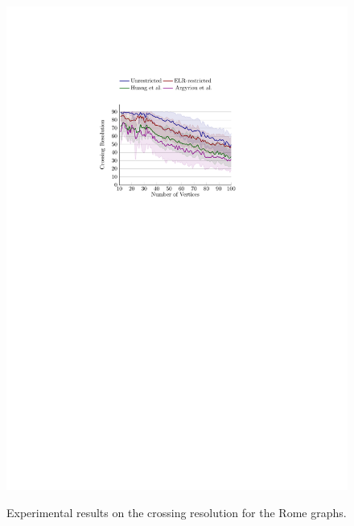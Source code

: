 \documentclass{comjnl}
\begin{document}
\begin{figure}[t]
{	\includegraphics[scale=0.99,page=4]{figures/rome_colored}}
	\caption{Experimental results on the crossing resolution for the Rome graphs.}
	\label{fig:cr-res}
\end{figure}
\end{document}
